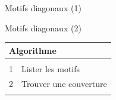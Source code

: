 \documentclass[10pt]{beamer}
\begin{document}
\begin{frame}{Motifs diagonaux (1)}
\begin{figure}
\centering
{}
\end{figure}
\end{frame}


\begin{frame}{Motifs diagonaux (2)}

\begin{center}
\begin{tabular}{|ll|}
\hline
\multicolumn{2}{|l|}{\textbf{Algorithme}} \\ \hline & \\
1& Lister les motifs \\
2& Trouver une couverture \\ & \\ \hline
\end{tabular}
\end{center}

\end{frame}
\end{document}
